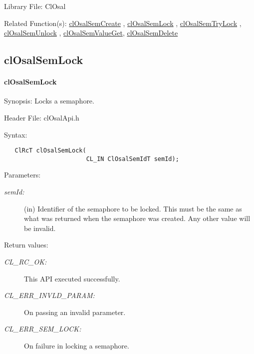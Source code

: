\begin{Desc}
\item[Library File:]Cl\-Osal\end{Desc}
\begin{Desc}
\item[Related Function(s):]\hyperlink{pageosal132}{cl\-Osal\-Sem\-Create} , \hyperlink{pageosal134}{cl\-Osal\-Sem\-Lock} , 
\hyperlink{pageosal135}{cl\-Osal\-Sem\-Try\-Lock} , \hyperlink{pageosal136}{cl\-Osal\-Sem\-Unlock} , 
\hyperlink{pageosal137}{cl\-Osal\-Sem\-Value\-Get}, \hyperlink{pageosal138}{cl\-Osal\-Sem\-Delete} \end{Desc}

\newpage
\subsection{clOsalSemLock} 
\hypertarget{pageosal134}{}\paragraph{cl\-Osal\-Sem\-Lock}\label{pageosal134}
\begin{Desc}
\item[Synopsis:]Locks a semaphore.\end{Desc}
\begin{Desc}
\item[Header File:]clOsalApi.h\end{Desc}
\begin{Desc}
\item[Syntax:]

\footnotesize\begin{verbatim}   ClRcT clOsalSemLock(
                       CL_IN ClOsalSemIdT semId);
\end{verbatim}
\normalsize
\end{Desc}
\begin{Desc}
\item[Parameters:]
\begin{description}
\item[{\em sem\-Id:}](in) Identifier of the semaphore to be locked. This must be the same as what was returned when the semaphore was created. Any other value will be invalid.\end{description}
\end{Desc}
\begin{Desc}
\item[Return values:]
\begin{description}
\item[{\em CL\_\-RC\_\-OK:}]This API executed successfully. \item[{\em CL\_\-ERR\_\-INVLD\_\-PARAM:}]On passing an invalid parameter. \item[{\em CL\_\-ERR\_\-SEM\_\-LOCK:}]On failure in locking a semaphore.\end{description}
\end{Desc}
